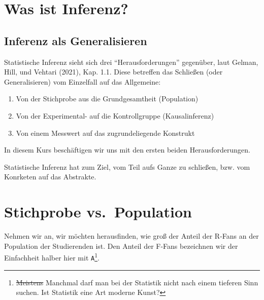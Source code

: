 \documentclass[
  a4paper,
  DIV=11]{scrreprt}
\providecommand{\tightlist}{%
  \setlength{\itemsep}{0pt}\setlength{\parskip}{0pt}}\usepackage{longtable,booktabs,array}
\theoremstyle{definition}
\theoremstyle{remark}
\begin{document}
\hypertarget{was-ist-inferenz}{%
\section{Was ist Inferenz?}\label{was-ist-inferenz}}

\hypertarget{inferenz-als-generalisieren}{%
\subsection{Inferenz als
Generalisieren}\label{inferenz-als-generalisieren}}

Statistische Inferenz sieht sich drei ``Herausforderungen'' gegenüber,
laut Gelman, Hill, und Vehtari (2021), Kap. 1.1. Diese betreffen das
Schließen (oder Generalisieren) vom Einzelfall auf das Allgemeine:

\begin{enumerate}
\def\labelenumi{\arabic{enumi}.}
\tightlist
\item
  Von der Stichprobe aus die Grundgesamtheit (Population)
\item
  Von der Experimental- auf die Kontrollgruppe (Kausalinferenz)
\item
  Von einem Messwert auf das zugrundeliegende Konstrukt
\end{enumerate}

In diesem Kurs beschäftigen wir uns mit den ersten beiden
Herausforderungen.

\begin{tcolorbox}[enhanced jigsaw, leftrule=.75mm, toptitle=1mm, bottomtitle=1mm, titlerule=0mm, breakable, colframe=quarto-callout-important-color-frame, title=\textcolor{quarto-callout-important-color}{\faExclamation}\hspace{0.5em}{Wichtig}, rightrule=.15mm, colback=white, arc=.35mm, left=2mm, bottomrule=.15mm, coltitle=black, opacitybacktitle=0.6, toprule=.15mm, colbacktitle=quarto-callout-important-color!10!white, opacityback=0]
Statistische Inferenz hat zum Ziel, vom Teil aufs Ganze zu schließen,
bzw. vom Konrketen auf das Abstrakte.
\end{tcolorbox}

\hypertarget{stichprobe-vs.-population}{%
\section{Stichprobe vs.~Population}\label{stichprobe-vs.-population}}

Nehmen wir an, wir möchten herausfinden, wie groß der Anteil der R-Fans
an der Population der Studierenden ist. Den Anteil der F-Fans bezeichnen
wir der Einfachheit halber hier mit \texttt{A}\footnote{\sout{Meistens}
  Manchmal darf man bei der Statistik nicht nach einem tieferen Sinn
  suchen. Ist Statistik eine Art moderne Kunst?}.
\end{document}
